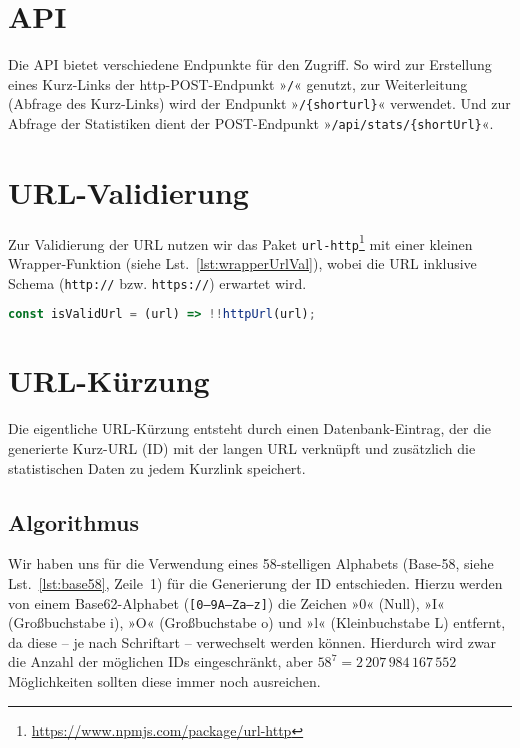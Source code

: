 \documentclass[a4paper,11pt,DIV=12,overfullrule=on]{scrreprt}%
\begin{document}
\section{API}
Die \ac{API} bietet verschiedene Endpunkte für den Zugriff. So wird zur Erstellung eines Kurz-Links der http-POST-Endpunkt »\texttt{/}« genutzt, zur Weiterleitung (Abfrage des Kurz-Links) wird der Endpunkt »\texttt{/\{shorturl\}}« verwendet. Und zur Abfrage der Statistiken dient der POST-Endpunkt »\texttt{/api/stats/\{shortUrl\}}«. 
\section{URL-Validierung}
Zur Validierung der URL nutzen wir das Paket \texttt{url-http}\footnote{\href{https://www.npmjs.com/package/url-http}{https://www.npmjs.com/package/url-http}} mit einer kleinen Wrapper-Funktion (siehe Lst.~\ref{lst:wrapperUrlVal}), wobei die \ac{URL} inklusive Schema (\texttt{http://} bzw. \texttt{https://}) erwartet wird.

\begin{lstlisting}[language=JavaScript,
    caption={Wrapper-Funktion zur URL-Validierung},
    label={lst:wrapperUrlVal},
    float=h,
    gobble=4
]
    const isValidUrl = (url) => !!httpUrl(url);
\end{lstlisting}


\section{URL-Kürzung}
Die eigentliche URL-Kürzung entsteht durch einen Datenbank-Eintrag, der die generierte Kurz-\ac{URL} (ID) mit der langen \ac{URL} verknüpft und zusätzlich die statistischen Daten zu jedem Kurzlink speichert.
\subsection{Algorithmus}
Wir haben uns für die Verwendung eines 58-stelligen Alphabets (Base-58\label{sec:base58}, siehe Lst.~\ref{lst:base58}, Zeile~1) für die Generierung der ID entschieden. Hierzu werden von einem Base62-Alphabet (\texttt{[0–9A–Za–z]}) die Zeichen »0« (Null), »I« (Großbuchstabe i), »O« (Großbuchstabe o) und »l« (Kleinbuchstabe L) entfernt, da diese – je nach Schriftart – verwechselt werden können. Hierdurch wird zwar die Anzahl der möglichen IDs eingeschränkt, aber $58^7 =  2\,207\,984\,167\,552$ Möglichkeiten sollten diese immer noch ausreichen.
\end{document}
